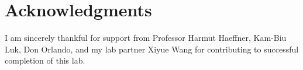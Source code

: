 \documentclass[iop,revtex4]{emulateapj_mod}
\begin{document}
\acknowledgments
\section*{Acknowledgments}
I am sincerely thankful for support from Professor Harmut Haeffner, Kam-Biu Luk, Don Orlando, and my lab partner Xiyue Wang for contributing to successful completion of this lab.


\end{document}
